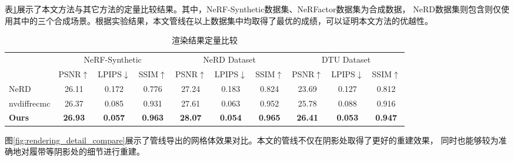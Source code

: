 表\ref{tab:dataset_comparison}展示了本文方法与其它方法的定量比较结果。其中，NeRF-Synthetic数据集、NeRFactor数据集为合成数据，
NeRD数据集则包含则仅使用其中的三个合成场景。根据实验结果，本文管线在以上数据集中均取得了最优的成绩，可以证明本文方法的优越性。

\begin{table}[h]
  \centering
  \caption{渲染结果定量比较}
  \begin{tabular}{l ccc ccc ccc}
      \toprule
      & \multicolumn{3}{c}{NeRF-Synthetic} & \multicolumn{3}{c}{NeRD Dataset} & \multicolumn{3}{c}{DTU Dataset} \\
      \cmidrule(lr){2-4} \cmidrule(lr){5-7} \cmidrule(lr){8-10}
      & PSNR$\uparrow$ & LPIPS$\downarrow$ & SSIM$\uparrow$ & PSNR$\uparrow$ & LPIPS$\downarrow$ & SSIM$\uparrow$ & PSNR$\uparrow$ & LPIPS$\downarrow$ & SSIM$\uparrow$ \\
      \midrule
      NeRD & 26.11 & 0.172 & 0.776 & 27.24 & 0.183 & 0.824 & 23.69 & 0.127 & 0.812 \\
      nvdiffrecmc & 26.37 & 0.085 & 0.931 & 27.61 & 0.063 & 0.952 & 25.78 & 0.088 & 0.916 \\
      \textbf{Ours} & \textbf{26.93} & \textbf{0.057} & \textbf{0.963} & \textbf{28.07} & \textbf{0.054} & \textbf{0.965} & \textbf{26.41} & \textbf{0.053} & \textbf{0.947} \\
      \bottomrule
  \end{tabular}
  \label{tab:dataset_comparison}
\end{table}

图\ref{fig:rendering_detail_compare}展示了管线导出的网格体效果对比。本文的管线不仅在阴影处取得了更好的重建效果，
同时也能够较为准确地对履带等阴影处的细节进行重建。

